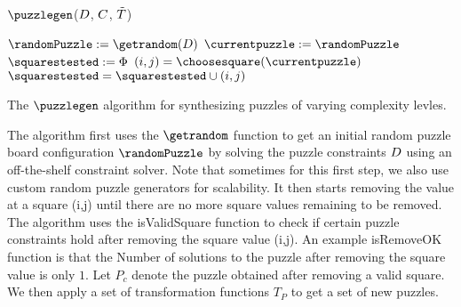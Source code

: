 \begin{algorithm}[!htpb]
\caption{$\puzzlegen$($D$, $C$, $\tilde{T}$)}
\begin{algorithmic}[1]
\STATE $\randomPuzzle := \getrandom(\puzzledecl)$
\STATE $\currentpuzzle := \randomPuzzle$
\STATE $\squarestested := \Phi$
\WHILE{$|\squarestested| \neq |\randomPuzzle|$}
\STATE $(i,j) = \choosesquare(\currentpuzzle)$
\STATE $\squarestested = \squarestested \cup (i,j)$
\STATE {\[ \currentpuzzle(k,l) = \left\{ 
  \begin{array}{l l}
    \currentpuzzle(k,l) & \quad \mbox{if $(k,l) \neq (i,j)$}\\
    \phi & \quad \mbox{if $(k,l) = (i,j)$}
  \end{array} \right.\]
}
\FOR{$\puzzletransform \in \puzzletransformset$}
\STATE{$\allpuzzles := \allpuzzles \cup \puzzletransform(\currentpuzzle)$}
\ENDFOR
\STATE{$\complexitydict := \{\}$}
\FOR{$\puzzleboard \in \allpuzzles$}
\STATE{$\complexitydict[h] := \complexitydict[h] \cup \puzzleboard$}
\ENDFOR
\ENDIF
\ENDWHILE
\RETURN{$\complexitydict$}
\end{algorithmic}
\caption{The $\puzzlegen$ algorithm for synthesizing puzzles of varying complexity levles.}
\end{algorithm}

The algorithm first uses the $\getrandom$ function to get an initial
random puzzle board configuration $\randomPuzzle$ by solving the
puzzle constraints $D$ using an off-the-shelf constraint
solver. Note that sometimes for this first step, we also use custom
random puzzle generators for scalability. It then starts removing the
value at a square (i,j) until there are no more square values
remaining to be removed. The algorithm uses the isValidSquare function
to check if certain puzzle constraints hold after removing the square
value (i,j). An example isRemoveOK function is that the Number of
solutions to the puzzle after removing the square value is only
$1$. Let $P_c$ denote the puzzle obtained after removing a valid
square. We then apply a set of transformation functions $T_P$ to get a
set of new puzzles.



